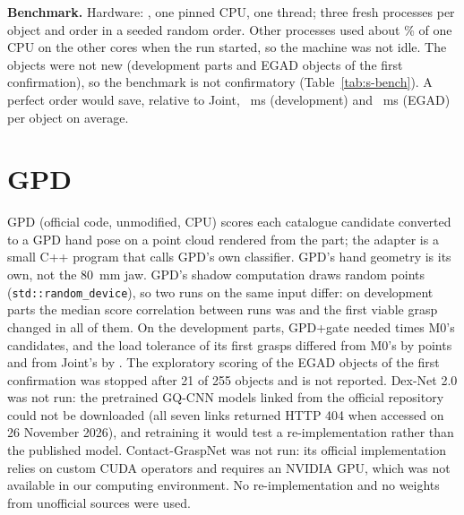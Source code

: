 \documentclass[pdflatex,sn-mathphys-num]{sn-jnl}
\begin{document}
\textbf{Benchmark.} Hardware: \benchCPU, one pinned CPU, one thread; three fresh processes per object and order in a seeded random order. Other processes used about \benchOtherLoad\% of one CPU on the other cores when the run started, so the machine was not idle. The objects were not new (development parts and EGAD objects of the first confirmation), so the benchmark is not confirmatory (Table~\ref{tab:s-bench}). A perfect order would save, relative to Joint, \ceilDevMs~ms (development) and \ceilEgadMs~ms (EGAD) per object on average.

\begin{table}[h]
\caption{Integrated implementation: geometric-mean ratio of cold-process wall time to the original planner, with 95\% $t$ CIs, objects faster/slower, warm-process ratio and median cold time.}\label{tab:s-bench}
\centering\scriptsize

\end{table}

\section{GPD}

GPD (official code, unmodified, CPU) scores each catalogue candidate converted to a GPD hand pose on a point cloud rendered from the part; the adapter is a small C++ program that calls GPD's own classifier. GPD's hand geometry is its own, not the 80~mm jaw. GPD's shadow computation draws random points (\texttt{std::random\_device}), so two runs on the same input differ: on \gpdVarObjects{} development parts the median score correlation between runs was \gpdVarCorr{} and the first viable grasp changed in all of them. On the \gpdDevObjects{} development parts, GPD+gate needed \gpdVsMzeroNF{} \gpdVsMzeroNFCI{} times M0's candidates, and the load tolerance of its first grasps differed from M0's by \gpdVsMzeroLoad{} \gpdVsMzeroLoadCI{} points and from Joint's by \gpdVsJointLoad{} \gpdVsJointLoadCI. The exploratory scoring of the EGAD objects of the first confirmation was stopped after 21 of 255 objects and is not reported. Dex-Net 2.0 was not run: the pretrained GQ-CNN models linked from the official repository could not be downloaded (all seven links returned HTTP 404 when accessed on 26 November 2026), and retraining it would test a re-implementation rather than the published model. Contact-GraspNet was not run: its official implementation relies on custom CUDA operators and requires an NVIDIA GPU, which was not available in our computing environment. No re-implementation and no weights from unofficial sources were used.
\end{document}
